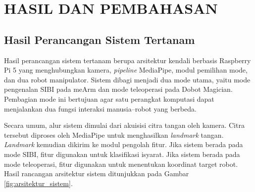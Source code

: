 \chapter{HASIL DAN PEMBAHASAN}

\section{Hasil Perancangan Sistem Tertanam}
Hasil perancangan sistem tertanam berupa arsitektur kendali berbasis Raspberry Pi 5 yang menghubungkan kamera, \textit{pipeline} MediaPipe, modul pemilihan mode, dan dua robot manipulator. Sistem dibagi menjadi dua mode utama, yaitu mode pengenalan SIBI pada meArm dan mode teleoperasi pada Dobot Magician. Pembagian mode ini bertujuan agar satu perangkat komputasi dapat menjalankan dua fungsi interaksi manusia--robot yang berbeda.

Secara umum, alur sistem dimulai dari akuisisi citra tangan oleh kamera. Citra tersebut diproses oleh MediaPipe untuk menghasilkan \textit{landmark} tangan. \textit{Landmark} kemudian dikirim ke modul pengolah fitur. Jika sistem berada pada mode SIBI, fitur digunakan untuk klasifikasi isyarat. Jika sistem berada pada mode teleoperasi, fitur digunakan untuk menentukan koordinat target robot. Hasil rancangan arsitektur sistem ditunjukkan pada Gambar \ref{fig:arsitektur_sistem}.

